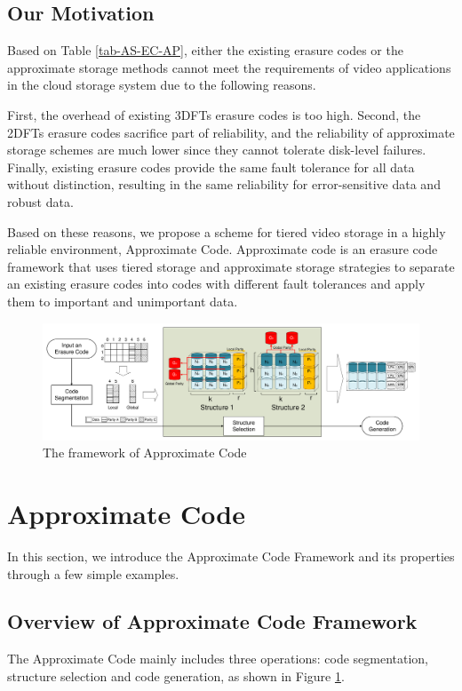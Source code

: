 \documentclass[sigconf]{acmart}
\begin{document}
\subsection{Our Motivation}
Based on Table \ref{tab-AS-EC-AP}, either the existing erasure codes or the approximate storage methods cannot meet the requirements of video applications in the cloud storage system due to the following reasons. 

First, the overhead of existing 3DFTs erasure codes is too high.
Second, the 2DFTs erasure codes sacrifice part of reliability, and the reliability of approximate storage schemes are much lower since they cannot tolerate disk-level failures.
Finally, existing erasure codes provide the same fault tolerance for all data without distinction, resulting in the same reliability for error-sensitive data and robust data.

Based on these reasons, we propose a scheme for tiered video storage in a highly reliable environment, Approximate Code.
Approximate code is an erasure code framework that uses tiered storage\cite{krish2014hats} \cite{wang2014balancing} \cite{zhang2010automated} \cite{udipi2012lot} and approximate storage strategies to separate an existing erasure codes into codes with different fault tolerances and apply them to important and unimportant data.

\begin{figure}[ht!]
\centering
\includegraphics[width=\linewidth]{photo/Framework-v2.pdf}
\caption{The framework of Approximate Code}
\label{fig-framework}
\end{figure}

\section{Approximate Code}\label{ApCode}
In this section, we introduce the Approximate Code Framework and its properties through a few simple examples. 

\subsection{Overview of Approximate Code Framework}
The Approximate Code mainly includes three operations: code segmentation, structure selection and code generation, as shown in Figure \ref{fig-framework}.
\end{document}
